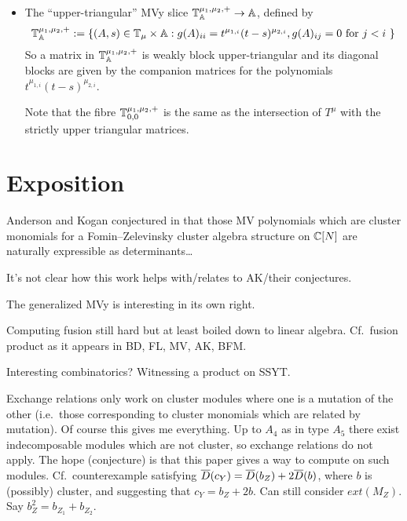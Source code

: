 \documentclass[draft]{article}
\begin{document}
\begin{itemize}
    \item The ``upper-triangular'' MVy slice $\mathbb T^{\mu_1, \mu_2,+}_\mathbb A \rightarrow \mathbb A $, defined by
    $$
    \mathbb T^{\mu_1, \mu_2,+}_\mathbb A := \{ (A,s) \in \mathbb T_\mu \times \mathbb A : g(A)_{ii} = t^{\mu_{1,i}} (t-s)^{\mu_{2,i}}, g(A)_{ij} = 0 \text{ for $ j < i $ }\}
    $$
    So a matrix in $\mathbb T^{\mu_1, \mu_2,+}_\mathbb A  $ is weakly block upper-triangular and its diagonal blocks are given by the companion matrices for the polynomials $t^{\mu_{1,i}} (t-s)^{\mu_{2,i}}$.
    
    Note that the fibre $  \mathbb T^{\mu_1, \mu_2,+}_{0,0}$ is the same as the intersection of $ T^\mu $ with the strictly upper triangular matrices.
    

\end{itemize}

\section{Exposition}

Anderson and Kogan conjectured in \cite{anderson2006algebra}  that those MV polynomials which are cluster monomials for a Fomin--Zelevinsky cluster algebra structure on $\mathbb C[N]$ are naturally expressible as determinants\dots

It's not clear how this work helps with/relates to AK/their conjectures.

The generalized MVy is interesting in its own right. 

Computing fusion still hard but at least boiled down to linear algebra. Cf.\ fusion product as it appears in BD, FL, MV, AK, BFM.

Interesting combinatorics? Witnessing a product on SSYT.

Exchange relations only work on cluster modules where one is a mutation of the other (i.e.\ those corresponding to cluster monomials which are related by mutation). Of course this gives me everything. Up to $A_4$ as in type $A_5$ there exist indecomposable modules which are not cluster, so exchange relations do not apply. The hope (conjecture) is that this paper gives a way to compute on such modules. Cf.\ counterexample satisfying $\overline{D}(c_Y) = \overline{D}(b_Z) + 2\overline{D}(b)$, where $b$ is (possibly) cluster, and suggesting that $c_Y = b_Z + 2b$. Can still consider $ext(M_Z)$. Say $b_Z^2 = b_{Z_1} + b_{Z_2}$. 
\end{document}
